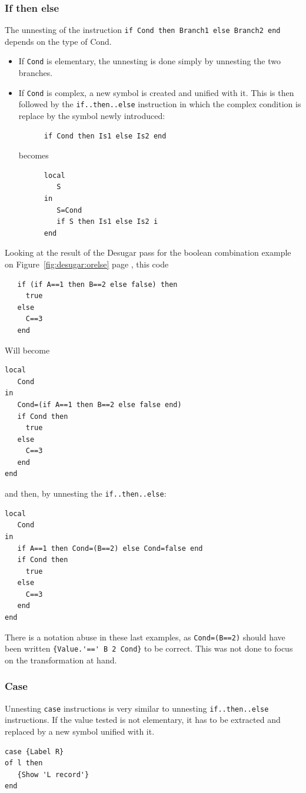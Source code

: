 \documentclass[a4paper]{memoir}
\begin{document}
\subsubsection{If then else}
The unnesting of the instruction \lstinline!if Cond then Branch1 else Branch2 end! depends on the type of Cond. 
\begin{itemize}
  \item If \lstinline!Cond! is elementary, the unnesting is done simply by unnesting the two branches.
  \item If \lstinline!Cond! is complex, a new symbol is created and unified with it. This is then followed by the \lstinline!if..then..else! instruction in which the complex condition is replace by the symbol newly introduced:
    \begin{lstlisting}
      if Cond then Is1 else Is2 end 
    \end{lstlisting}
    becomes 
    \begin{lstlisting}
      local 
         S 
      in 
         S=Cond 
         if S then Is1 else Is2 i
      end
    \end{lstlisting}
\end{itemize}
Looking at the result of the Desugar pass for the boolean combination example on
Figure~\ref{fig:desugar:orelse} page \pageref{fig:desugar:orelse}, this code
\begin{lstlisting}
   if (if A==1 then B==2 else false) then
     true
   else
     C==3
   end
\end{lstlisting}

Will become

\begin{lstlisting}
local
   Cond
in
   Cond=(if A==1 then B==2 else false end)
   if Cond then
     true
   else
     C==3
   end
end
\end{lstlisting}
and then, by unnesting the \lstinline!if..then..else!:
\begin{lstlisting}
local
   Cond
in
   if A==1 then Cond=(B==2) else Cond=false end
   if Cond then
     true
   else
     C==3
   end
end
\end{lstlisting}

There is a notation abuse in these last examples, as \lstinline!Cond=(B==2)!
should have been written \lstinline!{Value.'==' B 2 Cond}! to be correct. This was
not done to focus on the transformation at hand.

\subsubsection{Case}
Unnesting \lstinline!case! instructions is very similar to unnesting
\lstinline!if..then..else! instructions. If the value tested is not elementary,
it has to be extracted and replaced by a new symbol unified with it.
\begin{lstlisting}
case {Label R}
of l then
   {Show 'L record'}
end
\end{lstlisting}
\end{document}

